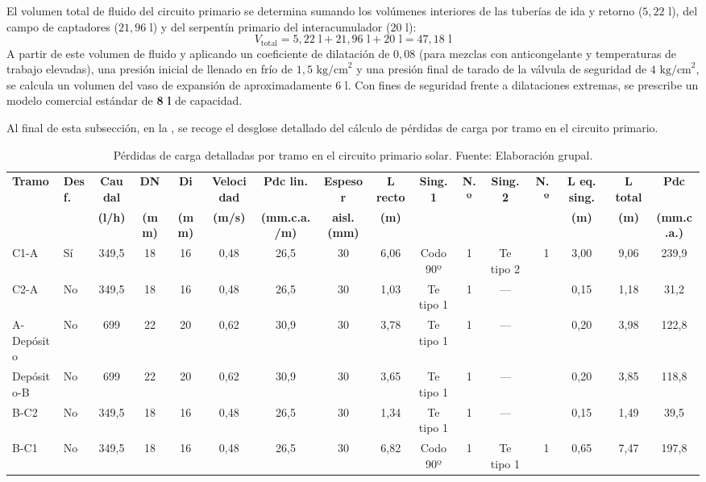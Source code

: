 \documentclass[12pt]{article}
\begin{document}
El volumen total de fluido del circuito primario se determina sumando los volúmenes interiores de las tuberías de ida y retorno ($5,22\text{ l}$), del campo de captadores ($21,96\text{ l}$) y del serpentín primario del interacumulador ($20\text{ l}$):
\begin{equation}
    V_{\text{total}} = 5,22\text{ l} + 21,96\text{ l} + 20\text{ l} = 47,18\text{ l}
\end{equation}
A partir de este volumen de fluido y aplicando un coeficiente de dilatación de $0,08$ (para mezclas con anticongelante y temperaturas de trabajo elevadas), una presión inicial de llenado en frío de $1,5\text{ kg/cm}^2$ y una presión final de tarado de la válvula de seguridad de $4\text{ kg/cm}^2$, se calcula un volumen del vaso de expansión de aproximadamente $6\text{ l}$. Con fines de seguridad frente a dilataciones extremas, se prescribe un modelo comercial estándar de \textbf{8 l} de capacidad.

Al final de esta subsección, en la , se recoge el desglose detallado del cálculo de pérdidas de carga por tramo en el circuito primario.

\begin{landscape}
\begin{table}[p]
\centering
\footnotesize
\setlength{\tabcolsep}{2pt}
\caption{Pérdidas de carga detalladas por tramo en el circuito primario solar. Fuente: Elaboración grupal.}
\label{tab:pdc_primario}
\begin{tabular}{llccccccccccrccc}
\toprule
\textbf{Tramo} & \textbf{Desf.} & \textbf{Caudal} & \textbf{DN} & \textbf{Di} & \textbf{Velocidad} & \textbf{Pdc lin.} & \textbf{Espesor} & \textbf{L recto} & \textbf{Sing. 1} & \textbf{N.º} & \textbf{Sing. 2} & \textbf{N.º} & \textbf{L eq. sing.} & \textbf{L total} & \textbf{Pdc} \\
 & & \textbf{(l/h)} & \textbf{(mm)} & \textbf{(mm)} & \textbf{(m/s)} & \textbf{(mm.c.a./m)} & \textbf{aisl. (mm)} & \textbf{(m)} & & & & & \textbf{(m)} & \textbf{(m)} & \textbf{(mm.c.a.)} \\
\midrule
C1-A & Sí & 349,5 & 18 & 16 & 0,48 & 26,5 & 30 & 6,06 & Codo 90º & 1 & Te tipo 2 & 1 & 3,00 & 9,06 & 239,9 \\
C2-A & No & 349,5 & 18 & 16 & 0,48 & 26,5 & 30 & 1,03 & Te tipo 1 & 1 & --- & & 0,15 & 1,18 & 31,2 \\
A-Depósito & No & 699 & 22 & 20 & 0,62 & 30,9 & 30 & 3,78 & Te tipo 1 & 1 & --- & & 0,20 & 3,98 & 122,8 \\
Depósito-B & No & 699 & 22 & 20 & 0,62 & 30,9 & 30 & 3,65 & Te tipo 1 & 1 & --- & & 0,20 & 3,85 & 118,8 \\
B-C2 & No & 349,5 & 18 & 16 & 0,48 & 26,5 & 30 & 1,34 & Te tipo 1 & 1 & --- & & 0,15 & 1,49 & 39,5 \\
B-C1 & No & 349,5 & 18 & 16 & 0,48 & 26,5 & 30 & 6,82 & Codo 90º & 1 & Te tipo 1 & 1 & 0,65 & 7,47 & 197,8 \\
\bottomrule
\end{tabular}
\end{table}
\end{landscape}
\end{document}
